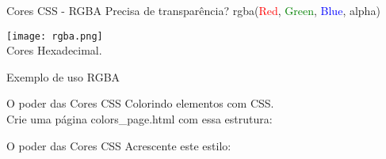 \documentclass{beamer}
\begin{document}
\begin{frame}{Cores CSS - RGBA}
Precisa de transparência? rgba(\textcolor{red}{Red}, \textcolor{green}{Green}, \textcolor{blue}{Blue}, 
alpha)\\
	\begin{center}
		  \texttt{[image: rgba.png]} \\
		  \tiny Cores Hexadecimal.
	  \end{center}
	  \begin{center}
		
		\tiny Exemplo de uso RGBA
	\end{center}
	  
\end{frame}
\begin{frame}{O poder das Cores CSS}
Colorindo elementos com CSS.\\
Crie uma página colors\_page.html com essa estrutura:
	\begin{center}
	 
	\end{center}	  
\end{frame}
\begin{frame}{O poder das Cores CSS}
Acrescente este estilo:
	\begin{center}
	 
	\end{center}	  
\end{frame}
\end{document}

